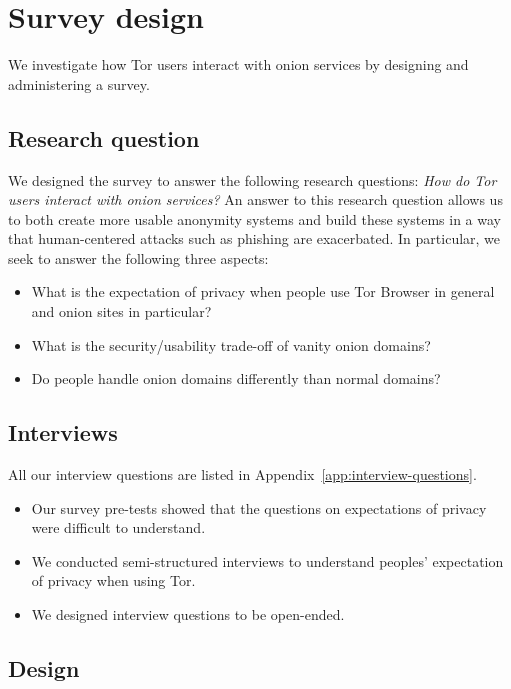 \section{Survey design}
\label{sec:survey-design}

We investigate how Tor users interact with onion services by designing and
administering a survey.

\subsection{Research question}
We designed the survey to answer the following research questions: \emph{How do
Tor users interact with onion services?}  An answer to this research question
allows us to both create more usable anonymity systems and build these systems
in a way that human-centered attacks such as phishing are exacerbated.  In
particular, we seek to answer the following three aspects:

\begin{itemize}
    \item What is the expectation of privacy when people use Tor Browser in
        general and onion sites in particular?
    \item What is the security/usability trade-off of vanity onion domains?
    \item Do people handle onion domains differently than normal domains?
\end{itemize}

\subsection{Interviews}
All our interview questions are listed in
Appendix~\ref{app:interview-questions}.
\begin{itemize}
    \item Our survey pre-tests showed that the questions on expectations of
        privacy were difficult to understand.
    \item We conducted semi-structured interviews to understand peoples'
        expectation of privacy when using Tor.
    \item We designed interview questions to be open-ended.
\end{itemize}

\subsection{Design}

